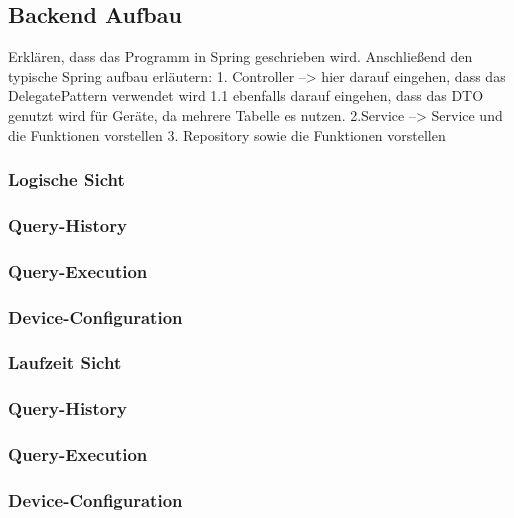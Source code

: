 \subsection{Backend Aufbau}
Erklären, dass das Programm in Spring geschrieben wird.
Anschließend den typische Spring aufbau erläutern:
1. Controller --> hier darauf eingehen, dass das DelegatePattern verwendet wird
1.1 ebenfalls darauf eingehen, dass das DTO genutzt wird für Geräte, da mehrere Tabelle es nutzen.
2.Service --> Service und die Funktionen vorstellen 
3. Repository sowie die Funktionen vorstellen



\subsubsection{Logische Sicht}
\subsubsection{Query-History}
\subsubsection{Query-Execution}
\subsubsection{Device-Configuration}


\subsubsection{Laufzeit Sicht}

\subsubsection{Query-History}
\subsubsection{Query-Execution}
\subsubsection{Device-Configuration}



